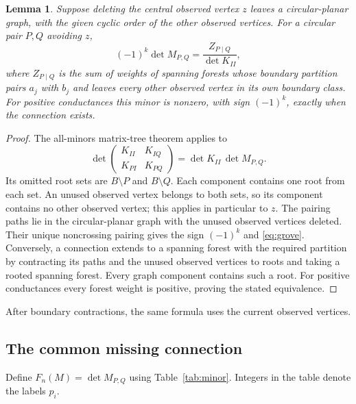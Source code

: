 \documentclass[11pt]{article}
\newtheorem{lemma}[theorem]{Lemma}
\theoremstyle{definition}
\begin{document}
\begin{lemma}
\label{lem:grove}
Suppose deleting the central observed vertex \(z\) leaves a circular-planar
graph, with the given cyclic order of the other observed vertices.
For a circular pair \(P,Q\) avoiding \(z\),
\begin{equation}
 (-1)^k\det M_{P,Q}
 =\frac{Z_{P\mid Q}}{\det K_{II}},
 \label{eq:grove}
\end{equation}
where \(Z_{P\mid Q}\) is the sum of weights of spanning forests whose
boundary partition pairs \(a_j\) with \(b_j\) and leaves every other
observed vertex in its own boundary class.
For positive conductances this minor is nonzero, with sign \((-1)^k\),
exactly when the connection exists.
\end{lemma}
\begin{proof}
The all-minors matrix-tree theorem \cite{Chaiken} applies to
\[
 \det\begin{pmatrix}K_{II}&K_{IQ}\\K_{PI}&K_{PQ}\end{pmatrix}
 =\det K_{II}\,\det M_{P,Q}.
\]
Its omitted root sets are \(B\setminus P\) and \(B\setminus Q\).
Each component contains one root from each set. An unused observed
vertex belongs to both sets, so its component contains no other
observed vertex; this applies in particular to \(z\).
The pairing paths lie in the circular-planar graph with the unused
observed vertices deleted. Their unique noncrossing pairing gives
the sign \((-1)^k\) and \eqref{eq:grove}.
Conversely, a connection extends to a spanning forest with the required
partition by contracting its paths and the unused observed vertices
to roots and taking a rooted spanning forest. Every graph component
contains such a root. For positive conductances every forest weight
is positive, proving the stated equivalence.
\end{proof}

After boundary contractions, the same formula uses the current
observed vertices.

\subsection{The common missing connection}
\label{sec:connection}

Define \(F_n(M)=\det M_{P,Q}\) using Table~\ref{tab:minor}.
Integers in the table denote the labels \(p_i\).
\end{document}
